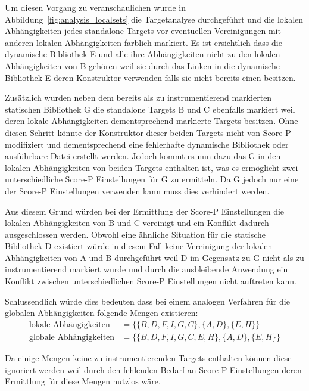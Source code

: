 \documentclass[german,proseminar,hyperref,utf8,lof]{zihpub}
\begin{document}
    Um diesen Vorgang zu veranschaulichen wurde in Abbildung~\ref{fig:analysis_localsets} die
    Targetanalyse durchgeführt und die lokalen Abhängigkeiten jedes standalone Targets vor eventuellen
    Vereinigungen mit anderen lokalen Abhängigkeiten farblich markiert.
    Es ist ersichtlich dass die dynamische Bibliothek E und alle ihre Abhängigkeiten nicht zu den
    lokalen Abhängigkeiten von B gehören weil sie durch das Linken in die dynamische Bibliothek E
    deren Konstruktor verwenden falls sie nicht bereits einen besitzen.

    Zusätzlich wurden neben dem bereits als zu instrumentierend markierten statischen Bibliothek G
    die standalone Targets B und C ebenfalls markiert weil deren lokale Abhängigkeiten dementsprechend
    markierte Targets besitzen.
    Ohne diesen Schritt könnte der Konstruktor dieser beiden Targets nicht von Score-P modifiziert und
    dementsprechend eine fehlerhafte dynamische Bibliothek oder ausführbare Datei erstellt werden.
    Jedoch kommt es nun dazu das G in den lokalen Abhängigkeiten von beiden Targets enthalten ist,
    was es ermöglicht zwei unterschiedliche Score-P Einstellungen für G zu ermitteln.
    Da G jedoch nur eine der Score-P Einstellungen verwenden kann muss dies verhindert werden.

    Aus diesem Grund würden bei der Ermittlung der Score-P Einstellungen die lokalen Abhängigkeiten
    von B und C vereinigt und ein Konflikt dadurch ausgeschlossen werden.
    Obwohl eine ähnliche Situation für die statische Bibliothek D existiert würde in diesem Fall keine
    Vereinigung der lokalen Abhängigkeiten von A und B durchgeführt weil D im Gegensatz zu G nicht
    als zu instrumentierend markiert wurde und durch die ausbleibende Anwendung ein Konflikt zwischen
    unterschiedlichen Score-P Einstellungen nicht auftreten kann.

    Schlussendlich würde dies bedeuten dass bei einem analogen Verfahren für die globalen Abhängigkeiten
    folgende Mengen existieren:
    \begin{align*}
        \text{lokale Abhängigkeiten} &= \{ \{ B, D, F, I, G, C \}, \{ A, D \}, \{ E, H \} \} \\
        \text{globale Abhängigkeiten} &= \{ \{ B, D, F, I, G, C, E, H \}, \{ A, D \}, \{ E, H \} \}
    \end{align*}

    Da einige Mengen keine zu instrumentierenden Targets enthalten können diese ignoriert werden
    weil durch den fehlenden Bedarf an Score-P Einstellungen deren Ermittlung für diese Mengen
    nutzlos wäre.
\end{document}
